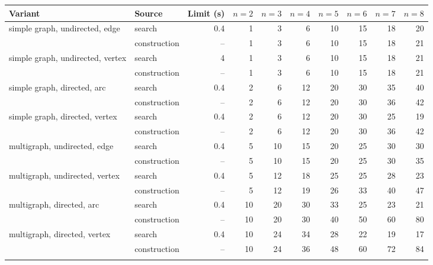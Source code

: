 \begin{tabular}{llrrrrrrrr}
\toprule
Variant & Source & Limit (s) & $n=2$ & $n=3$ & $n=4$ & $n=5$ & $n=6$ & $n=7$ & $n=8$ \\
\midrule
simple graph, undirected, edge & search & 0.4 & 1 & 3 & 6 & 10 & 15 & 18 & 20 \\
 & construction & -- & 1 & 3 & 6 & 10 & 15 & 18 & 21 \\
\addlinespace[2pt]
simple graph, undirected, vertex & search & 4 & 1 & 3 & 6 & 10 & 15 & 18 & 21 \\
 & construction & -- & 1 & 3 & 6 & 10 & 15 & 18 & 21 \\
\addlinespace[2pt]
simple graph, directed, arc & search & 0.4 & 2 & 6 & 12 & 20 & 30 & 35 & 40 \\
 & construction & -- & 2 & 6 & 12 & 20 & 30 & 36 & 42 \\
\addlinespace[2pt]
simple graph, directed, vertex & search & 0.4 & 2 & 6 & 12 & 20 & 30 & 25 & 19 \\
 & construction & -- & 2 & 6 & 12 & 20 & 30 & 36 & 42 \\
\addlinespace[2pt]
multigraph, undirected, edge & search & 0.4 & 5 & 10 & 15 & 20 & 25 & 30 & 30 \\
 & construction & -- & 5 & 10 & 15 & 20 & 25 & 30 & 35 \\
\addlinespace[2pt]
multigraph, undirected, vertex & search & 0.4 & 5 & 12 & 18 & 25 & 25 & 28 & 23 \\
 & construction & -- & 5 & 12 & 19 & 26 & 33 & 40 & 47 \\
\addlinespace[2pt]
multigraph, directed, arc & search & 0.4 & 10 & 20 & 30 & 33 & 25 & 23 & 21 \\
 & construction & -- & 10 & 20 & 30 & 40 & 50 & 60 & 80 \\
\addlinespace[2pt]
multigraph, directed, vertex & search & 0.4 & 10 & 24 & 34 & 28 & 22 & 19 & 17 \\
 & construction & -- & 10 & 24 & 36 & 48 & 60 & 72 & 84 \\
\addlinespace[2pt]
\bottomrule
\end{tabular}
